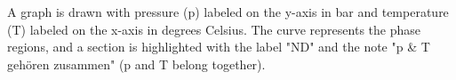 A graph is drawn with pressure (p) labeled on the y-axis in bar and temperature (T) labeled on the x-axis in degrees Celsius. The curve represents the phase regions, and a section is highlighted with the label "ND" and the note "p & T gehören zusammen" (p and T belong together).